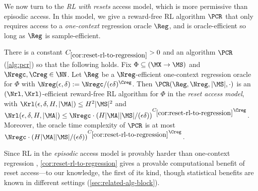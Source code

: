 We now turn to the \emph{RL with resets} access model, which is more permissive than episodic access. In this model, we give a reward-free RL algorithm $\PCR$ that only requires access to a \emph{one-context} regression oracle $\Reg$, and is oracle-efficient so long as $\Reg$ is sample-efficient.



\begin{theorem}\label{cor:reset-rl-to-regression}
There is a constant $C_{\ref{cor:reset-rl-to-regression}}>0$ and an algorithm $\PCR$ (\cref{alg:pcr}) so that the following holds. Fix $\Phi \subseteq (\MX\to\MS)$ and $\Nregc,\Creg \in \NN$. Let $\Reg$ be a $\Nreg$-efficient one-context regression oracle for $\Phi$ with $\Nreg(\epsilon,\delta) := \Nregc/(\epsilon\delta)^{\Creg}$.
Then $\PCR(\Reg,\Nreg,|\MS|,\cdot)$ %
is an $(\Nrl,\Krl)$-efficient reward-free RL algorithm for $\Phi$ in the \emph{reset access model}, with $\Krl(\epsilon,\delta,H,|\MA|) \leq H^2|\MS|^2$ and $\Nrl(\epsilon,\delta,H,|\MA|) \leq \Nregc \cdot \left(H|\MA||\MS|/(\epsilon\delta)\right)^{C_{\ref{cor:reset-rl-to-regression}}\Creg}.$
Moreover, the oracle time complexity of $\PCR$ is at most $\Nregc \cdot \left(H|\MA||\MS|/(\epsilon\delta)\right)^{C_{\ref{cor:reset-rl-to-regression}}\Creg}.$
\end{theorem}

\arxiv{}

Since RL in the \emph{episodic} access model is provably harder than one-context regression \citep{golowich2024exploration}, \cref{cor:reset-rl-to-regression} gives a provable computational benefit of reset access---to our knowledge, the first of its kind, though statistical benefits are known in different settings (\cref{sec:related-alg-block}).%

